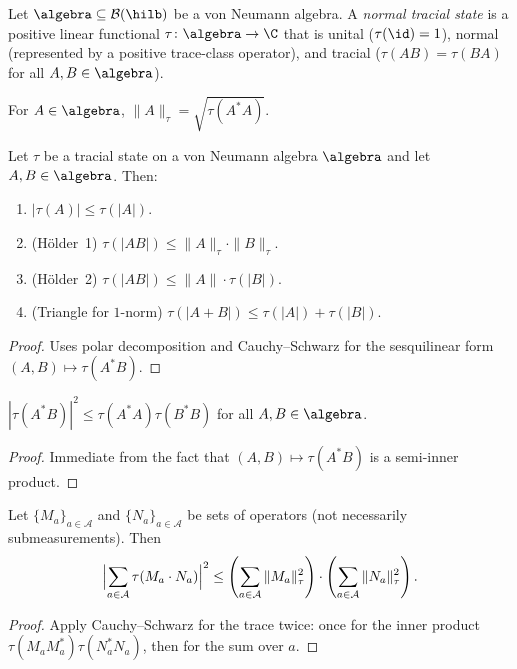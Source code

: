 \begin{definition}\label{def:tracial-state}
  Let $\algebra\subseteq\mathcal{B}(\hilb)$ be a von Neumann algebra.
  A \emph{normal tracial state} is a positive linear functional
  $\tau\colon\algebra\to\C$ that is unital ($\tau(\id)=1$),
  normal (represented by a positive trace-class operator),
  and tracial ($\tau(AB)=\tau(BA)$ for all $A,B\in\algebra$).
\end{definition}

\begin{definition}\label{def:tau-norm}
  For $A\in\algebra$,
  $\|A\|_\tau = \sqrt{\tau(A^*A)}$.
\end{definition}

\begin{proposition}\label{prop:holder}
  Let $\tau$ be a tracial state on a von Neumann algebra $\algebra$
  and let $A,B\in\algebra$. Then:
  \begin{enumerate}
    \item $|\tau(A)|\le\tau(|A|)$.
    \item (H\"older~1) $\tau(|AB|)\le\|A\|_\tau\cdot\|B\|_\tau$.
    \item (H\"older~2) $\tau(|AB|)\le\|A\|\cdot\tau(|B|)$.
    \item (Triangle for $1$-norm) $\tau(|A+B|)\le\tau(|A|)+\tau(|B|)$.
  \end{enumerate}
\end{proposition}
\begin{proof}
  Uses polar decomposition and Cauchy--Schwarz for the sesquilinear form
  $(A,B)\mapsto\tau(A^*B)$.
\end{proof}

\begin{proposition}\label{prop:basic-cauchy-schwarz}
  $|\tau(A^*B)|^2\le\tau(A^*A) \tau(B^*B)$ for all $A,B\in\algebra$.
\end{proposition}
\begin{proof}
  Immediate from the fact that $(A,B)\mapsto\tau(A^*B)$ is a semi-inner product.
\end{proof}

\begin{proposition}\label{prop:cs-operator-sets}
  Let $\{M_a\}_{a\in\mathcal{A}}$ and $\{N_a\}_{a\in\mathcal{A}}$ be sets
  of operators (not necessarily submeasurements). Then
  \[
    \Bigl|\sum_{a\in\mathcal{A}}\tau(M_a \cdot N_a)\Bigr|^2
    \le
    \left(\sum_{a\in\mathcal{A}}\|M_a\|_\tau^2\right)
    \cdot
    \left(\sum_{a\in\mathcal{A}}\|N_a\|_\tau^2\right).
  \]
\end{proposition}
\begin{proof}
  Apply Cauchy--Schwarz for the trace twice: once for the inner product
  $\tau(M_a M_a^*)\tau(N_a^* N_a)$, then for the sum over $a$.
\end{proof}

